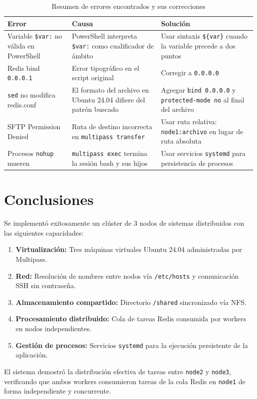 \documentclass[12pt,a4paper]{article}
\begin{document}
\begin{table}[H]
\centering
\small
\begin{tabular}{@{}p{3cm}p{4.5cm}p{5.5cm}@{}}
\toprule
\textbf{Error} & \textbf{Causa} & \textbf{Solución} \\
\midrule
Variable \texttt{\$var:} no válida en PowerShell &
PowerShell interpreta \texttt{\$var:} como cualificador de ámbito &
Usar sintaxis \texttt{\$\{var\}} cuando la variable precede a dos puntos \\
\midrule
Redis bind \texttt{0.0.0.1} &
Error tipográfico en el script original &
Corregir a \texttt{0.0.0.0} \\
\midrule
\texttt{sed} no modifica redis.conf &
El formato del archivo en Ubuntu 24.04 difiere del patrón buscado &
Agregar \texttt{bind 0.0.0.0} y \texttt{protected-mode no} al final del archivo \\
\midrule
SFTP Permission Denied &
Ruta de destino incorrecta en \texttt{multipass transfer} &
Usar ruta relativa: \texttt{node1:archivo} en lugar de ruta absoluta \\
\midrule
Procesos \texttt{nohup} mueren &
\texttt{multipass exec} termina la sesión bash y sus hijos &
Usar servicios \texttt{systemd} para persistencia de procesos \\
\bottomrule
\end{tabular}
\caption{Resumen de errores encontrados y sus correcciones}
\end{table}

\section{Conclusiones}

Se implementó exitosamente un clúster de 3 nodos de sistemas distribuidos con las siguientes capacidades:

\begin{enumerate}
    \item \textbf{Virtualización:} Tres máquinas virtuales Ubuntu 24.04 administradas por Multipass.
    \item \textbf{Red:} Resolución de nombres entre nodos vía \texttt{/etc/hosts} y comunicación SSH sin contraseña.
    \item \textbf{Almacenamiento compartido:} Directorio \texttt{/shared} sincronizado vía NFS.
    \item \textbf{Procesamiento distribuido:} Cola de tareas Redis consumida por workers en nodos independientes.
    \item \textbf{Gestión de procesos:} Servicios \texttt{systemd} para la ejecución persistente de la aplicación.
\end{enumerate}

El sistema demostró la distribución efectiva de tareas entre \texttt{node2} y \texttt{node3}, verificando que ambos workers consumieron tareas de la cola Redis en \texttt{node1} de forma independiente y concurrente.
\end{document}
